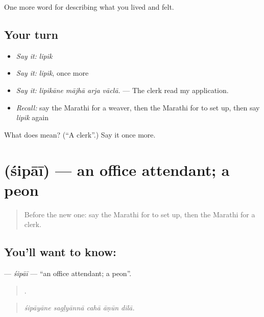 \begin{grammarlens}[title={What you've built}]
One more word for describing what you lived and felt.
\end{grammarlens}

\subsection*{Your turn}
\begin{itemize}
\raggedright
  \item \emph{Say it:} \emph{lipik}
  \item \emph{Say it:} \emph{lipik}, once more
  \item \emph{Say it:} \emph{lipikāne mājhā arja vāclā.} — The clerk read my application.
  \item \emph{Recall:} say the Marathi for a weaver, then the Marathi for to set up, then say \emph{lipik} again
\end{itemize}

\begin{tcolorbox}[breakable,colback=teal!4,colframe=teal!35!black,title={Before you move on}]
What does  mean? (\textquotedblleft{}A clerk\textquotedblright{}.) Say it once more.
\end{tcolorbox}
\section[\texorpdfstring{\mr{शिपाई} (śipāī)}{शिपाई (śipāī)}]{ (śipāī) — an office attendant; a peon}

\label{lesson:MR-C506-sipai}



\begin{quote}
Before the new one: say the Marathi for to set up, then the Marathi for a clerk.
\end{quote}

\subsection*{You'll want to know: }
\textbf{} — \emph{śipāī} — \textquotedblleft{}an office attendant; a peon\textquotedblright{}.

\begin{quote}
    .
\end{quote}

\begin{quote}
\emph{śipāyāne sagḷyānnā cahā āṇūn dilā.}
\end{quote}

